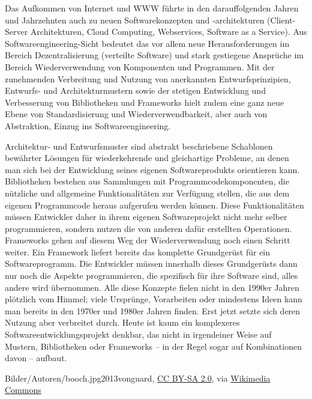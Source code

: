 Das Aufkommen von Internet und WWW führte in den darauffolgenden Jahren und Jahrzehnten auch zu neuen Softwarekonzepten und -architekturen (\zb Client-Server Architekturen, Cloud Computing, Webservices, Software as a Service). Aus Soft\-ware\-engi\-neer\-ing-Sicht bedeutet das vor allem neue Herausforderungen 
\linebreak %
im Bereich Dezentralisierung (verteilte Software) und stark gestiegene Ansprüche im Bereich Wiederverwendung von Komponenten und Programmen. Mit der zunehmenden Verbreitung und Nutzung von anerkannten Entwurfsprinzipien, Entwurfs- und Architekturmustern sowie der stetigen Entwicklung und Verbesserung von 
\linebreak %
Bibliotheken und Frameworks hielt zudem eine ganz neue Ebene von Standardisierung und Wiederverwendbarkeit, aber auch von Abstraktion, Einzug ins Softwareengineering. 

Architektur- und Entwurfsmuster 
sind abstrakt beschriebene Schablonen bewährter Lösungen für wiederkehrende und gleichartige Probleme, an denen man sich bei der Entwicklung seines eigenen Softwareprodukts orientieren kann. Bibliotheken bestehen aus Sammlungen mit Programmcodekomponenten, die nützliche und allgemeine Funktionalitäten zur Verfügung stellen, die aus dem eigenen Programmcode heraus aufgerufen werden können. Diese Funktionalitäten müssen Entwickler daher in ihrem eigenen Softwareprojekt nicht mehr selber programmieren, sondern nutzen die von anderen dafür erstellten Operationen. Frameworks gehen auf diesem Weg der Wiederverwendung noch einen Schritt weiter. Ein Framework liefert bereits das komplette Grundgerüst für ein Softwareprogramm. Die Entwickler müssen innerhalb dieses Grundgerüsts dann nur noch die Aspekte programmieren, die spezifisch für ihre Software sind, alles andere wird übernommen. Alle diese Konzepte fielen nicht in den 1990er Jahren plötzlich vom Himmel; viele Ursprünge, Vorarbeiten oder mindestens Ideen kann man bereits in den 1970er und 1980er Jahren finden. Erst jetzt setzte sich deren Nutzung aber verbreitet durch. Heute ist kaum ein komplexeres Softwareentwicklungsprojekt denkbar, das nicht in irgendeiner Weise auf Mustern, Bibliotheken oder Frameworks -- in der Regel sogar auf Kombinationen davon -- aufbaut.


{Bilder/Autoren/booch.jpg}{2013}{vonguard, \href{https://creativecommons.org/licenses/by-sa/2.0}{CC BY-SA 2.0}, via \href{https://commons.wikimedia.org/wiki/File:Grady_Booch,_CHM_2011_2_cropped.jpg}{Wikimedia Commons}}


